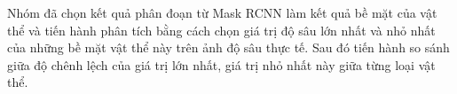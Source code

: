 Nhóm đã chọn kết quả phân đoạn từ Mask RCNN làm kết quả bề mặt của vật thể  và tiến hành phân tích bằng cách chọn giá trị độ sâu lớn nhất và nhỏ nhất của những bề mặt vật thể này trên ảnh độ sâu thực tế. Sau đó tiến hành so sánh giữa độ chênh lệch của giá trị lớn nhất, giá trị nhỏ nhất này giữa từng loại vật thể. 


 
 